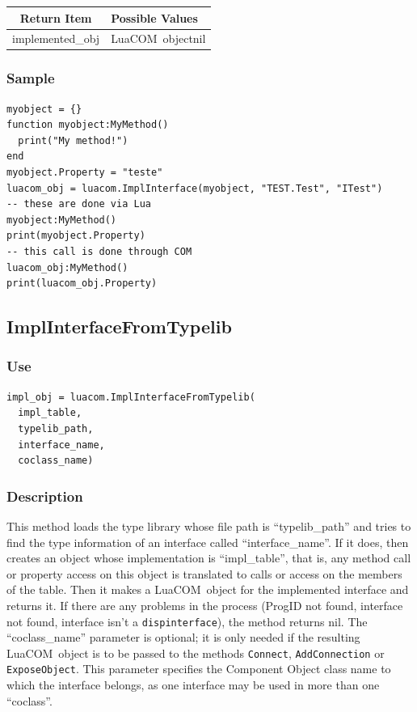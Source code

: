 \documentclass[11pt,a4paper,english]{report}
\newcommand{\ident}[1]{\mbox{\texttt{#1}}}
\newcommand{\techname}[1]{\mbox{#1}}
\newcommand{\luacom}{\techname{LuaCOM}}
\newcommand{\dispinterface}{\ident{dispinterface}}
\begin{document}
\begin{tabular}{|c|p{4cm}|}
\hline
\bf Return Item & \bf Possible Values \\ \hline \hline
implemented\_obj  & \luacom\ object\newline nil \\ \hline
\end{tabular}

\subsubsection*{Sample}

\begin{verbatim}
myobject = {}
function myobject:MyMethod()
  print("My method!")
end
myobject.Property = "teste"
luacom_obj = luacom.ImplInterface(myobject, "TEST.Test", "ITest")
-- these are done via Lua
myobject:MyMethod()
print(myobject.Property)
-- this call is done through COM
luacom_obj:MyMethod()
print(luacom_obj.Property)
\end{verbatim}


\subsection*{ImplInterfaceFromTypelib}

\subsubsection*{Use}

\begin{verbatim}
impl_obj = luacom.ImplInterfaceFromTypelib(
  impl_table,
  typelib_path,
  interface_name,
  coclass_name)
\end{verbatim}

\subsubsection*{Description}
This method loads the type library whose file path is
``typelib\_path'' and tries to find the type information of an
interface called ``interface\_name''. If it does, then creates an
object whose implementation is ``impl\_table'', that is, any method
call or property access on this object is translated to calls or
access on the members of the table. Then it makes a \luacom\ object
for the implemented interface and returns it. If there are any
problems in the process (ProgID not found, interface not found,
interface isn't a \dispinterface), the method returns nil. The
``coclass\_name'' parameter is optional; it is only needed if the
resulting \luacom\ object is to be passed to the methods
\verb+Connect+, \verb+AddConnection+ or
\verb+ExposeObject+. This parameter specifies the Component
Object class name to which the interface belongs, as one interface may
be used in more than one ``coclass''.
\end{document}
